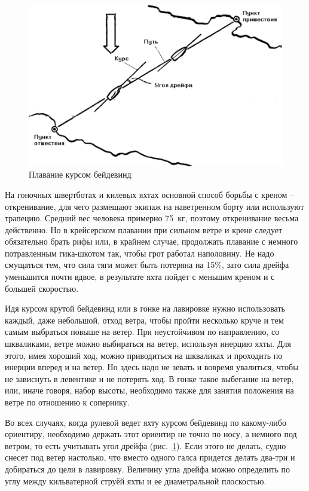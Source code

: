 \documentclass[a4paper, 12pt, twoside, final]{scrbook}
\begin{document}
\begin{figure}[htbp]
   \centering
   \includegraphics{105_Plavanie_kursom_bejdevind} %
   \caption{Плавание курсом бейдевинд}
   \label{fig:105}
\end{figure}

На гоночных швертботах и килевых яхтах основной способ борьбы с креном \--- откренивание, для чего размещают экипаж на наветренном борту или используют трапецию. Средний вес человека примерно 75~кг, поэтому откренивание весьма действенно. Но в крейсерском плавании при сильном ветре и крене следует обязательно брать рифы или, в крайнем случае, продолжать плавание с немного потравленным гика-шкотом так, чтобы грот работал наполовину. Не надо смущаться тем, что сила тяги может быть потеряна на 15\%, зато сила дрейфа уменьшится почти вдвое, в результате яхта пойдет с меньшим креном и с большей скоростью.

Идя курсом крутой бейдевинд или в гонке на лавировке нужно использовать каждый, даже небольшой, отход ветра, чтобы пройти несколько круче и тем самым выбраться повыше на ветер. При неустойчивом по направлению, со шкваликами, ветре можно выбираться на ветер, используя инерцию яхты. Для этого, имея хороший ход, можно приводиться на шкваликах и проходить по инерции вперед и на ветер. Но здесь надо не зевать и вовремя увалиться, чтобы не зависнуть в левентике и не потерять ход. В гонке такое выбегание на ветер, или, иначе говоря, набор высоты, необходимо также для занятия положения на ветре по отношению к сопернику.

Во всех случаях, когда рулевой ведет яхту курсом бейдевинд по какому-либо ориентиру, необходимо держать этот ориентир не точно по носу, а немного под ветром, то есть учитывать угол дрейфа (рис.~\ref{fig:105}). Если этого не делать, судно снесет под ветер настолько, что вместо одного галса придется делать два-три и добираться до цели в лавировку. Величину угла дрейфа можно определить по углу между кильватерной струёй яхты и ее диаметральной плоскостью.
\end{document}
